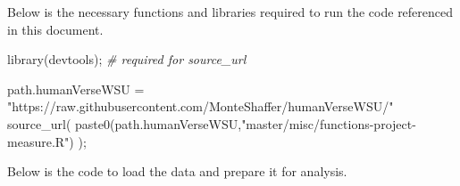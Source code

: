 \documentclass[]{article}
\newenvironment{Shaded}{\begin{snugshade}}{\end{snugshade}}
\newcommand{\CommentTok}[1]{\textcolor[rgb]{0.56,0.35,0.01}{\textit{#1}}}
\newcommand{\FunctionTok}[1]{\textcolor[rgb]{0.00,0.00,0.00}{#1}}
\newcommand{\NormalTok}[1]{#1}
\newcommand{\OtherTok}[1]{\textcolor[rgb]{0.56,0.35,0.01}{#1}}
\newcommand{\StringTok}[1]{\textcolor[rgb]{0.31,0.60,0.02}{#1}}
\begin{document}
Below is the necessary functions and libraries required to run the code
referenced in this document.

\begin{Shaded}
\begin{Highlighting}[]
\FunctionTok{library}\NormalTok{(devtools);       }\CommentTok{\# required for source\_url}

\NormalTok{path.humanVerseWSU }\OtherTok{=} \StringTok{"https://raw.githubusercontent.com/MonteShaffer/humanVerseWSU/"}
\FunctionTok{source\_url}\NormalTok{( }\FunctionTok{paste0}\NormalTok{(path.humanVerseWSU,}\StringTok{"master/misc/functions{-}project{-}measure.R"}\NormalTok{) );}
\end{Highlighting}
\end{Shaded}

Below is the code to load the data and prepare it for analysis.
\end{document}

